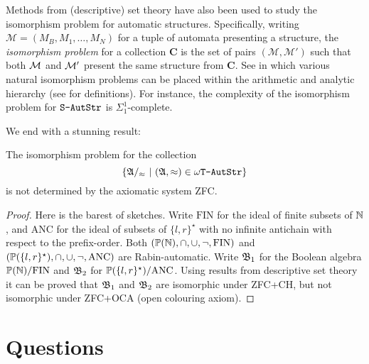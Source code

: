 Methods from (descriptive) set theory have also been used to study the isomorphism problem for automatic structures.
Specifically, writing $\mathcal{M} = (M_B,M_1,\dots,M_N)$ for a tuple of automata presenting a structure, the {\em isomorphism problem} for a collection
$\mathbf{C}$ is the set of pairs $(\mathcal{M},\mathcal{M'})$ such that both ${\mathcal M}$ and ${\mathcal M}'$ present the same structure from $\mathbf{C}$. See \cite{Rubi04,KLL10LICS,KLL13,Kuske14} in which various natural isomorphism problems can be placed within the arithmetic and analytic hierarchy (see \cite{Roge67} for definitions). For instance, the complexity of the
isomorphism problem for $\mbox{\tt S-AutStr}$ is $\Sigma^1_1$-complete.

We end with a stunning result:

\begin{theorem}
The isomorphism problem for the collection 
\[
\{\mathfrak{A}/_\approx \ \vert \  (\mathfrak{A},\approx) \in \mbox{\tt $\omega$T-AutStr}\}
\]
is not determined by the axiomatic system \textrm{ZFC}.
\end{theorem}

\begin{proof}
Here is the barest of sketches. 
Write $\mathrm{FIN}$ for the ideal of finite subsets of $\mathbb{N}$, and $\mathrm{ANC}$ for the ideal of subsets of $\{l,r\}^\star$ with no infinite antichain with respect to the prefix-order.
Both $({\mathbb P}(\mathbb{N}),\cap,\cup,\neg,\mathrm{FIN})$ and $({\mathbb P}(\{l,r\}^\star),\cap,\cup,\neg,\mathrm{ANC})$ are Rabin-automatic. Write $\mathfrak{B}_1$ for the Boolean algebra ${\mathbb P}(\mathbb{N})/\mathrm{FIN}$ and $\mathfrak{B}_2$ for ${\mathbb P}(\{l,r\}^\star)/\mathrm{ANC}$.
Using results from descriptive set theory it can be proved  that $\mathfrak{B}_1$ and $\mathfrak{B}_2$  are isomorphic under ZFC+CH, but  not isomorphic under ZFC+OCA (open colouring axiom).
\end{proof}


\section{Questions} \label{AS:sec:summary}


